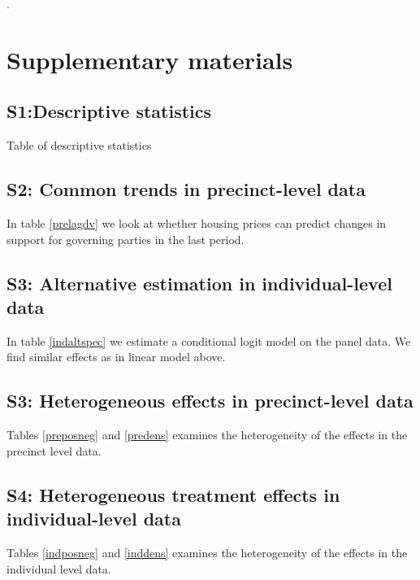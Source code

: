\documentclass[12pt,a4paper]{article}
\begin{document}
.





\clearpage

\singlespacing




\newpage

\section*{Supplementary materials}

\subsection*{S1:Descriptive statistics}

Table of descriptive statistics

\newpage

\subsection*{S2: Common trends in precinct-level data}
In table \ref{prelagdv} we look at whether housing prices can predict changes in support for governing parties in the last period. 




\newpage

\subsection*{S3: Alternative estimation in individual-level data}
In table \ref{indaltspec} we estimate a conditional logit model on the panel data. We find similar effects as in linear model above.



\newpage

\subsection*{S3: Heterogeneous effects in precinct-level data}
Tables \ref{preposneg} and \ref{predens} examines the heterogeneity of the effects in the precinct level data.





\newpage



\subsection*{S4: Heterogeneous treatment effects in individual-level data}
Tables \ref{indposneg} and \ref{inddens} examines the heterogeneity of the effects in the individual level data.




\end{document}
